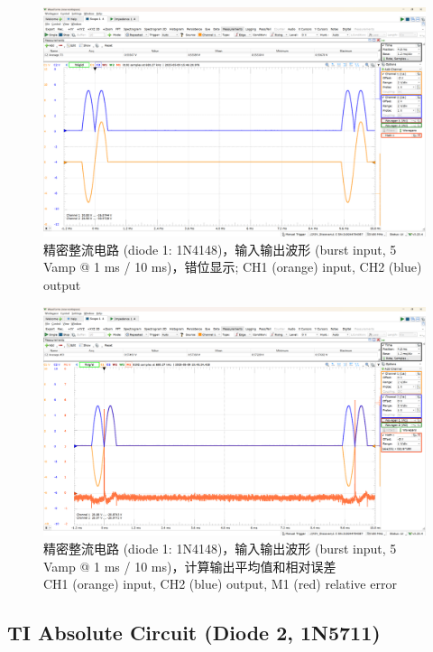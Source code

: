 \documentclass[UTF8]{article}
\begin{document}
\begin{figure}[H]\centering
    \includegraphics[width=\columnwidth]{LCE-05-精密整流/assets/1N4148/1N4148 brust wave (1 kHz) (2).png}
    \caption{精密整流电路 (diode 1: 1N4148)，输入输出波形 (burst input, 5 Vamp @  1 ms / 10 ms)，错位显示; CH1 (orange) input, CH2 (blue) output}
\end{figure}

\begin{figure}[H]\centering
    \includegraphics[width=\columnwidth]{LCE-05-精密整流/assets/1N4148/1N4148 brust wave (1 kHz).png}
    \caption{精密整流电路 (diode 1: 1N4148)，输入输出波形 (burst input, 5 Vamp @ 1 ms / 10 ms)，计算输出平均值和相对误差\\CH1 (orange) input, CH2 (blue) output, M1 (red) relative error}
\end{figure}


\subsection{TI Absolute Circuit (Diode 2, 1N5711)}
\end{document}
